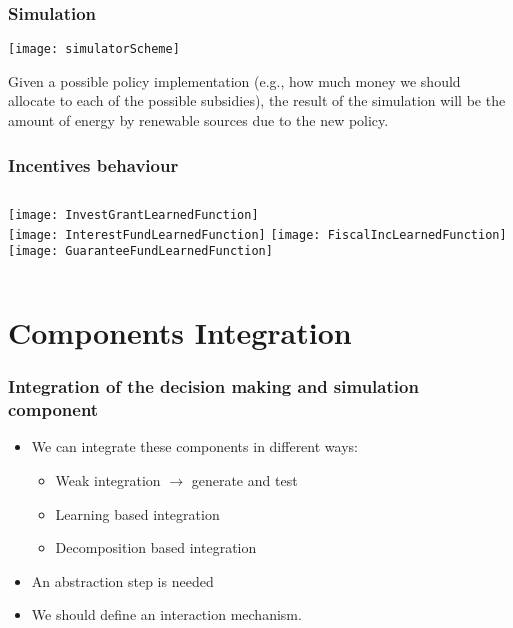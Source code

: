 \documentclass{beamer}
\begin{document}
	\begin{frame}
	\frametitle{Simulation}
			\centering
			\texttt{[image: simulatorScheme]}
			\begin{block}{}
				Given a possible policy implementation (e.g., how much money we should allocate to each of the possible subsidies), the result of the simulation will be the amount of energy by renewable sources due to the new policy.
			\end{block}
	\end{frame}
	
	\begin{frame}
	\frametitle{Incentives behaviour}
		\begin{columns}[t]
			\column{.5\textwidth}
			\centering
			\texttt{[image: InvestGrantLearnedFunction]}\\		
			\texttt{[image: InterestFundLearnedFunction]}
			\column{.5\textwidth}
			\centering
			\texttt{[image: FiscalIncLearnedFunction]}\\
			\texttt{[image: GuaranteeFundLearnedFunction]}
		\end{columns}
	\end{frame}
	
\section{Components Integration}
	
	\begin{frame}
	\frametitle{Integration of the decision making and simulation component}
		\begin{itemize}
			\item We can integrate these components in different ways:
			\begin{itemize}
				\item<1-> Weak integration $ \rightarrow $ generate and test
				\item<1-| alert@2> Learning based integration
				\item<1-> Decomposition based integration 
			\end{itemize}
			\item An abstraction step is needed
			\item We should define an interaction mechanism.
		\end{itemize}
	\end{frame}
	
\end{document}
